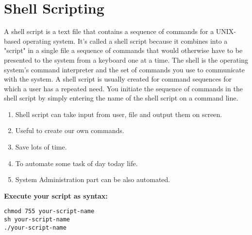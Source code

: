 \section{Shell Scripting}
A shell script is a text file that contains a sequence of commands for a UNIX-based operating system. It's called a shell script because it combines into a "script" in a single file a sequence of commands that would otherwise have to be presented to the system from a keyboard one at a time. The shell is the operating system's command interpreter and the set of commands you use to communicate with the system. A shell script is usually created for command sequences for which a user has a repeated need. You initiate the sequence of commands in the shell script by simply entering the name of the shell script on a command line.
\begin{enumerate} 
\item Shell script can take input from user, file and output them on screen.
\item Useful to create our own commands.
\item Save lots of time.
\item To automate some task of day today life.
\item System Administration part can be also automated.
\end{enumerate} 
{ \bf Execute your script as syntax:}
\begin{verbatim}
chmod 755 your-script-name
sh your-script-name
./your-script-name
\end{verbatim}
